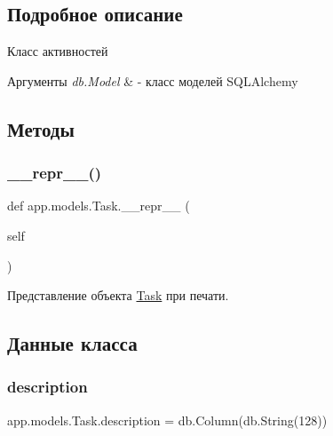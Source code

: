 \subsection{Подробное описание}
Класс активностей 


\begin{DoxyParams}{Аргументы}
{\em db.\+Model} & -\/ класс моделей S\+Q\+L\+Alchemy \\
\hline
\end{DoxyParams}


\subsection{Методы}
\mbox{\label{classapp_1_1models_1_1_task_a878962473a5595e85e499f7572bd9ebd}} 
\subsubsection{\texorpdfstring{\+\_\+\+\_\+repr\+\_\+\+\_\+()}{\_\_repr\_\_()}}
{\footnotesize\ttfamily def app.\+models.\+Task.\+\_\+\+\_\+repr\+\_\+\+\_\+ (\begin{DoxyParamCaption}\item[{}]{self }\end{DoxyParamCaption})}



Представление объекта \mbox{\hyperlink{classapp_1_1models_1_1_task}{Task}} при печати. 



\subsection{Данные класса}
\mbox{\label{classapp_1_1models_1_1_task_af0ef177b07b0af27261c072ed5e550ee}} 
\subsubsection{\texorpdfstring{description}{description}}
{\footnotesize\ttfamily app.\+models.\+Task.\+description = db.\+Column(db.\+String(128))\hspace{0.3cm}{\ttfamily [static]}}

